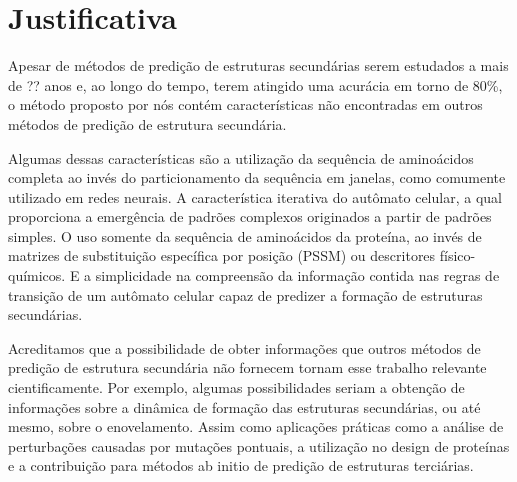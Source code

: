 \chapter{Justificativa}

Apesar de métodos de predição de estruturas secundárias serem estudados a mais de ?? anos e, ao longo do tempo, terem atingido uma acurácia em torno de 80\%, o método proposto por nós contém características não encontradas em outros métodos de predição de estrutura secundária.

Algumas dessas características são a utilização da sequência de aminoácidos completa ao invés do particionamento da sequência em janelas, como comumente utilizado em redes neurais. A característica iterativa do autômato celular, a qual proporciona a emergência de padrões complexos originados a partir de padrões simples. O uso somente da sequência de aminoácidos da proteína, ao invés de matrizes de substituição específica por posição (PSSM) ou descritores físico-químicos. E a simplicidade na compreensão da informação contida nas regras de transição de um autômato celular capaz de predizer a formação de estruturas secundárias. 

Acreditamos que a possibilidade de obter informações que outros métodos de predição de estrutura secundária não fornecem tornam esse trabalho relevante cientificamente. Por exemplo, algumas possibilidades seriam a obtenção de informações sobre a dinâmica de formação das estruturas secundárias, ou até mesmo, sobre o enovelamento. Assim como aplicações práticas como a análise de perturbações causadas por mutações pontuais, a utilização no design de proteínas e a contribuição para métodos ab initio de predição de estruturas terciárias.


